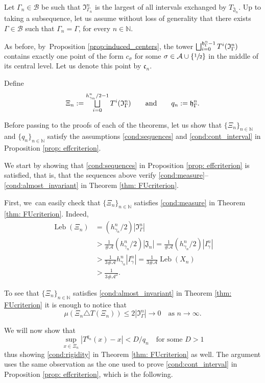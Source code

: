 \documentclass[JEP,XML,SOM,Unicode,NoEqCountersInSection,NoFloatCountersInSection,published]{cedram}
\let\oldbigsqcup\bigsqcup
\renewcommand{\bigsqcup}{\mathop{\textstyle\oldbigsqcup}\displaylimits}
\DeclareMathOperator{\Leb}{Leb}
\theoremstyle{plain}
\theoremstyle{definition}
\newcommand{\A}{\mathcal{A}}
\newcommand{\B}{\mathcal{B}}
\newcommand{\N}{\mathbb{N}}
\begin{document}
Let $\Gamma_n \in \B$ be such that $\mathfrak I_{\Gamma_n}^n$ is the largest of all intervals exchanged by $T_{\mathfrak J_n}$. Up to taking a subsequence, let us assume without loss of generality that there exists $\Gamma \in \B$ such that $\Gamma_n = \Gamma$, for every $n \in \N$.

As before, by~Proposition \ref{prop:induced_centers}, the tower $\bigsqcup_{i=0}^{\mathfrak h_{\Gamma}^n-1}T^i(\mathfrak I_{\Gamma}^n)$ contains exactly one point of the form $c_{\sigma}$ for some $\sigma \in \A \cup \{\sfrac{1}{2}\}$ in the middle of its central level. Let us denote this point by $\mathfrak c_n$.

Define
\[
\Xi_n:=\bigsqcup_{i=0}^{h_{\gamma_n}^n/2-1}T^{i}(\mathfrak I_{\Gamma}^n)\qquad \text{and}\qquad q_n:=\mathfrak h_{\Gamma}^n.
\]

Before passing to the proofs of each of the theorems, let us show that $\{\Xi_n\}_{n\in\N}$ and $\{q_n\}_{n\in\N}$ satisfy the assumptions \eqref{cond:sequences} and \eqref{cond:cont_interval} in Proposition \ref{prop: effcriterion}.

We start by showing that \eqref{cond:sequences} in Proposition \ref{prop: effcriterion} is satisfied, that is, that the sequences above verify \eqref{cond:measure}--\eqref{cond:almost_invariant} in Theorem \ref{thm: FUcriterion}.

First, we~can easily check that $\{\Xi_n\}_{n \in \N}$ satisfies \eqref{cond:measure} in Theorem \ref{thm: FUcriterion}. Indeed,
\begin{align*}
\Leb(\Xi_n) & =(h_{\gamma_n}^n/2)|\mathfrak I_{\Gamma}^n| \\ & > \frac{1}{\#\A}(h_{\gamma_n}^n/2)|\mathfrak J_n|=\frac{1}{\#\A}(h_{\gamma_n}^n/2)|I^n_{\gamma}| \\
& > \frac{1}{3\#\A} h_{\gamma_n}^n|I^n_{\gamma}|=\frac{1}{3\#\A} \Leb(X_n) \\
& >\frac{1}{3\#\A^2}.
\end{align*}

To see that $\{\Xi_n\}_{n\in\N}$ satisfies \eqref{cond:almost_invariant} in Theorem \ref{thm: FUcriterion} it is enough to notice that
\[
\mu(\Xi_n\triangle T(\Xi_n))\le 2|\mathfrak I_{\Gamma}^n|\to 0 \quad\text{as }n\to\infty.
\]

We will now show that
\begin{equation}\label{eq: derbound}
\sup_{x\in\Xi_n}|T^{q_n}(x)-x|<D/q_n\quad\text{for some }D>1
\end{equation}
thus showing \eqref{cond:rigidity} in Theorem \ref{thm: FUcriterion} as well. The argument uses the same observation as the one used to prove \eqref{cond:cont_interval} in Proposition \ref{prop: effcriterion}, which is the following.
\end{document}
